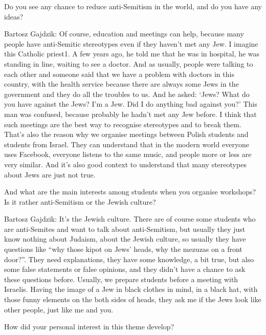  Do you see any chance to reduce anti-Semitism in the world, and do you have any ideas? 

Bartosz Gajdzik: Of course, education and meetings can help, because many people have anti-Semitic stereotypes even if they haven’t met any Jew. I imagine this Catholic priest1. A few years ago, he told me that he was in hospital, he was standing in line, waiting to see a doctor. And as usually, people were talking to each other and someone said that we have a problem with doctors in this country, with the health service because there are always some Jews in the government and they do all the troubles to us. And he asked: ‘Jews? What do you have against the Jews? I’m a Jew. Did I do anything bad against you?’ This man was confused, because probably he hadn’t met any Jew before. I think that such meetings are the best way to recognise stereotypes and to break them. That’s also the reason why we organise meetings between Polish students and students from Israel. They can understand that in the modern world everyone uses Facebook, everyone listens to the same music, and people more or less are very similar. And it’s also good context to understand that many stereotypes about Jews are just not true.  

And what are the main interests among students when you organise workshops? Is it rather anti-Semitism or the Jewish culture?   

Bartosz Gajdzik: It’s the Jewish culture. There are of course some students who are anti-Semites and want to talk about anti-Semitism, but usually they just know nothing about Judaism, about the Jewish culture, so usually they have questions like “why those kipot on Jews’ heads, why the mezuzas on a front door?”. They need explanations, they have some knowledge, a bit true, but also some false statements or false opinions, and they didn’t have a chance to ask these questions before. Usually, we prepare students before a meeting with Israelis. Having the image of a Jew in black clothes in mind, in a black hat, with those funny elements on the both sides of heads, they ask me if the Jews look like other people, just like me and you.  

 How did your personal interest in this theme develop? 

